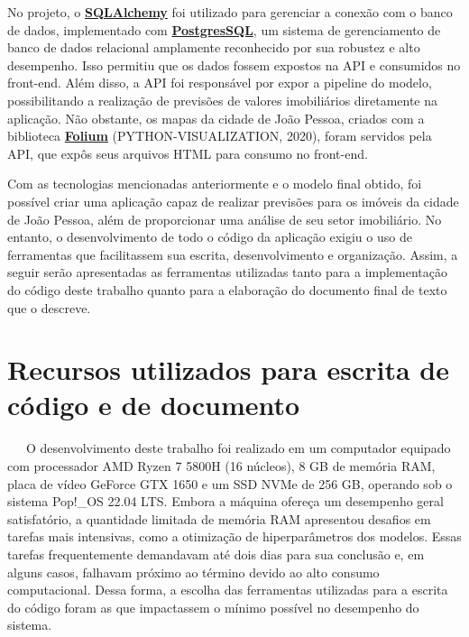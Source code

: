 \documentclass[
  12pt,
  a4paper,
]{scrreprt}
\begin{document}
No projeto, o \href{https://www.sqlalchemy.org/}{\textbf{SQLAlchemy}}
foi utilizado para gerenciar a conexão com o banco de dados,
implementado com
\href{https://www.postgresql.org/}{\textbf{PostgresSQL}}, um sistema de
gerenciamento de banco de dados relacional amplamente reconhecido por
sua robustez e alto desempenho. Isso permitiu que os dados fossem
expostos na API e consumidos no front-end. Além disso, a API foi
responsável por expor a pipeline do modelo, possibilitando a realização
de previsões de valores imobiliários diretamente na aplicação. Não
obstante, os mapas da cidade de João Pessoa, criados com a biblioteca
\href{https://python-visualization.github.io/folium/latest/}{\textbf{Folium}}
(PYTHON-VISUALIZATION, 2020), foram servidos pela API, que expôs seus
arquivos HTML para consumo no front-end.

\vspace{12pt}

Com as tecnologias mencionadas anteriormente e o modelo final obtido,
foi possível criar uma aplicação capaz de realizar previsões para os
imóveis da cidade de João Pessoa, além de proporcionar uma análise de
seu setor imobiliário. No entanto, o desenvolvimento de todo o código da
aplicação exigiu o uso de ferramentas que facilitassem sua escrita,
desenvolvimento e organização. Assim, a seguir serão apresentadas as
ferramentas utilizadas tanto para a implementação do código deste
trabalho quanto para a elaboração do documento final de texto que o
descreve.

\section{Recursos utilizados para escrita de código e de
documento}\label{recursos-utilizados-para-escrita-de-cuxf3digo-e-de-documento}

~~~O desenvolvimento deste trabalho foi realizado em um computador
equipado com processador AMD Ryzen 7 5800H (16 núcleos), 8 GB de memória
RAM, placa de vídeo GeForce GTX 1650 e um SSD NVMe de 256 GB, operando
sob o sistema Pop!\_OS 22.04 LTS. Embora a máquina ofereça um desempenho
geral satisfatório, a quantidade limitada de memória RAM apresentou
desafios em tarefas mais intensivas, como a otimização de
hiperparâmetros dos modelos. Essas tarefas frequentemente demandavam até
dois dias para sua conclusão e, em alguns casos, falhavam próximo ao
término devido ao alto consumo computacional. Dessa forma, a escolha das
ferramentas utilizadas para a escrita do código foram as que impactassem
o mínimo possível no desempenho do sistema.
\end{document}
